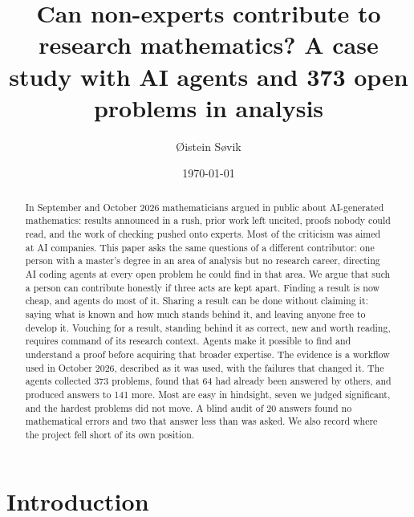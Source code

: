 \documentclass[11pt]{amsart}
\begin{document}
\title[Non-experts, AI agents and research mathematics]{Can non-experts
  contribute to research mathematics? A case study with AI agents and 373 open
  problems in analysis}
\author{Øistein Søvik}
\date{\today}

\begin{abstract}
In September and October 2026 mathematicians argued in public about
AI-generated mathematics: results announced in a rush, prior work left uncited,
proofs nobody could read, and the work of checking pushed onto experts. Most of
the criticism was aimed at AI companies. This paper asks the same questions of
a different contributor: one person with a master's degree in an area of
analysis but no research career, directing AI coding agents at every open
problem he could find in that area. We argue that such a person can contribute
honestly if three acts are kept apart. Finding a result is now cheap, and
agents do most of it. Sharing a result can be done without claiming it: saying
what is known and how much stands behind it, and leaving anyone free to develop
it. Vouching for a result, standing behind it as correct, new and worth
reading, requires command of its research context. Agents make it possible to
find and understand a proof before acquiring that broader expertise. The
evidence is a workflow used in October 2026, described as it was used, with the
failures that changed it. The agents collected 373 problems, found that 64 had
already been answered by others, and produced answers to 141 more. Most are
easy in hindsight, seven we judged significant, and the hardest problems did
not move. A blind audit of 20 answers found no mathematical errors and two that
answer less than was asked. We also record where the project fell short of its
own position.
\end{abstract}

\maketitle

\section{Introduction}
\end{document}
